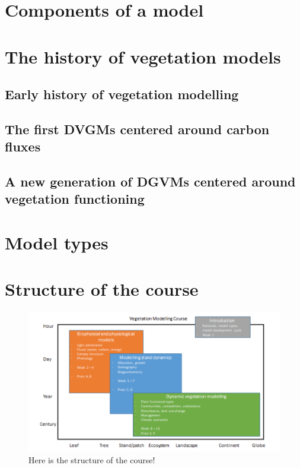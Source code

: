 \documentclass[]{book}
\begin{document}
\section{Components of a model}\label{components-of-a-model}

\section{The history of vegetation
models}\label{the-history-of-vegetation-models}

\subsection{Early history of vegetation
modelling}\label{early-history-of-vegetation-modelling}

\subsection{The first DVGMs centered around carbon
fluxes}\label{the-first-dvgms-centered-around-carbon-fluxes}

\subsection{A new generation of DGVMs centered around vegetation
functioning}\label{a-new-generation-of-dgvms-centered-around-vegetation-functioning}

\section{Model types}\label{model-types}

\section{Structure of the course}\label{structure-of-the-course}

\begin{figure}

{\centering \includegraphics[width=0.8\linewidth]{figures/Figure_course} 

}

\caption{Here is the structure of the course!}\label{fig:nice-fig2}
\end{figure}
\end{document}
